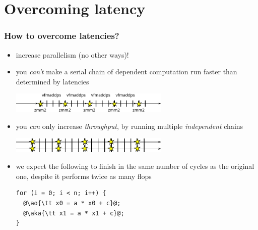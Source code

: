 \documentclass[12pt,dvipdfmx]{beamer}
\newcommand{\ao}[1]{{\color{blue}#1}}
\newcommand{\aka}[1]{{\color{red}#1}}
\begin{document}
\section{Overcoming latency}
\begin{frame}[fragile]
\frametitle{How to overcome latencies?}

\begin{itemize}
\item increase parallelism (no other ways)!

\item<2-> you \ao{\em can't} make a serial chain of dependent computation
  run faster than determined by latencies

\begin{center}
\includegraphics[width=0.6\textwidth]{out/pdf/svg/latency_1.pdf}
\end{center}

\item<3-> you \ao{\em can} only increase \ao{\em throughput},
  by running multiple {\it independent} chains

\begin{center}
\includegraphics[width=0.6\textwidth]{out/pdf/svg/latency_3.pdf}
\end{center}

\item<4-> we expect the following to finish in 
  the same number of cycles as the original one,
  despite it performs twice as many flops

\begin{lstlisting}
for (i = 0; i < n; i++) {
  @\ao{\tt x0 = a * x0 + c}@;
  @\aka{\tt x1 = a * x1 + c}@;
}
\end{lstlisting}
\end{itemize}
\end{frame}
\end{document}
